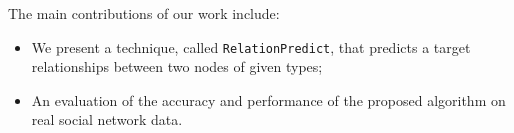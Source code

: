 \cite{Zhu2016} \cite{sun2011pathsim} \cite{Sun:2012:HRP:2124295.2124373}  \cite{huang2016meta} \cite{wang2016relsim} \cite{sun2013pathselclus} \cite{sun2011ASONAM} \cite{Yang2012} \cite{liben2007link}





The main contributions of our work include:

\begin{itemize}

\item We present a technique, called \texttt{RelationPredict}, that predicts a target relationships between two nodes of given types;

\item An evaluation of the accuracy and performance of the proposed algorithm on real social network data.

\end{itemize}


